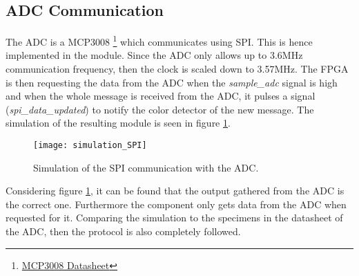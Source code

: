 
\subsection{ADC Communication}
The ADC is a MCP3008 \footnote{ \href{https://www.adafruit.com/datasheets/MCP3008.pdf}{MCP3008 Datasheet} } which communicates using SPI.
This is hence implemented in the module.
Since the ADC only allows up to 3.6MHz communication frequency, then the clock is scaled down to 3.57MHz.
The FPGA is then requesting the data from the ADC when the \textit{sample\_adc} signal is high and when the whole message is received from the ADC, it pulses a signal (\textit{spi\_data\_updated}) to notify the color detector of the new message.
The simulation of the resulting module is seen in figure \ref{fig:spi_simulation}.


\begin{figure}[H]
\centering
\texttt{[image: simulation\_SPI]}
\caption{Simulation of the SPI communication with the ADC.}
\label{fig:spi_simulation}
\end{figure}

Considering figure \ref{fig:spi_simulation}, it can be found that the output gathered from the ADC is the correct one.
Furthermore the component only gets data from the ADC when requested for it.
Comparing the simulation to the specimens in the datasheet of the ADC, then the protocol is also completely followed.